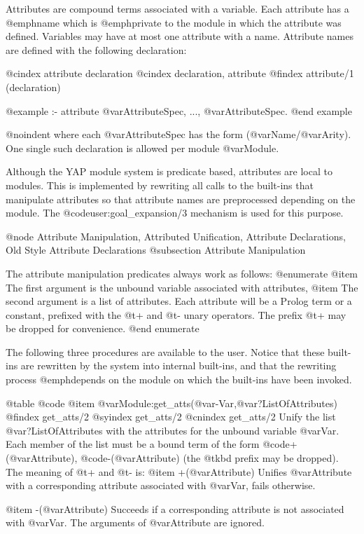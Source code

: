 {{{{{{{{{Attributes are compound terms associated with a variable. Each attribute
has a @emph{name} which is @emph{private} to the module in which the
attribute was defined. Variables may have at most one attribute with a
name. Attribute names are defined with the following declaration:

@cindex attribute declaration
@cindex declaration, attribute
@findex attribute/1 (declaration)

@example
:- attribute @var{AttributeSpec}, ..., @var{AttributeSpec}.
@end example

@noindent
where each @var{AttributeSpec} has the form (@var{Name}/@var{Arity}).
One single such declaration is allowed per module @var{Module}.

Although the YAP module system is predicate based, attributes are local
to modules. This is implemented by rewriting all calls to the
built-ins that manipulate attributes so that attribute names are
preprocessed depending on the module.  The @code{user:goal_expansion/3}
mechanism is used for this purpose.


@node Attribute Manipulation, Attributed Unification, Attribute Declarations, Old Style Attribute Declarations
@subsection Attribute Manipulation


The  attribute manipulation predicates always work as follows:
@enumerate
@item The first argument is the unbound variable associated with
attributes,
@item The second argument is a list of attributes. Each attribute will
be a Prolog term or a constant, prefixed with the @t{+} and @t{-} unary
operators. The prefix @t{+} may be dropped for convenience.
@end enumerate

The following three procedures are available to the user. Notice that
these built-ins are rewritten by the system into internal built-ins, and
that the rewriting process @emph{depends} on the module on which the
built-ins have been invoked.

@table @code
@item @var{Module}:get_atts(@var{-Var},@var{?ListOfAttributes})
@findex get_atts/2
@syindex get_atts/2
@cnindex get_atts/2
Unify the list @var{?ListOfAttributes} with the attributes for the unbound
variable @var{Var}. Each member of the list must be a bound term of the
form @code{+(@var{Attribute})}, @code{-(@var{Attribute})} (the @t{kbd}
prefix may be dropped). The meaning of @t{+} and @t{-} is:
@item +(@var{Attribute})
Unifies @var{Attribute} with a corresponding attribute associated with
@var{Var}, fails otherwise.

@item -(@var{Attribute})
Succeeds if a corresponding attribute is not associated with
@var{Var}. The arguments of @var{Attribute} are ignored.

}}}}}}}}}
